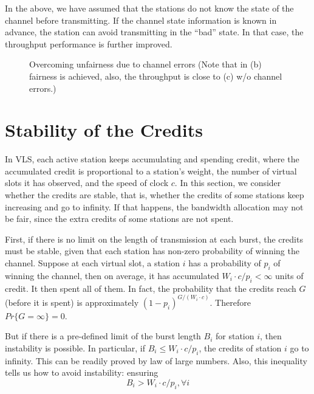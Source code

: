 \documentclass[letterpaper, 10 pt, conference]{ieeeconf}
\begin{document}
In the above, we have assumed that the stations do not know the state
of the channel before transmitting. If the channel state information
is known in advance, the station can avoid transmitting in the {}``bad''
state. In that case, the throughput performance is further improved.

\begin{figure}


\caption{\label{fig:channel error}Overcoming unfairness due to channel errors (Note that in (b) fairness is achieved, also, the throughput is close
to (c) w/o channel errors.)}

\end{figure}




\section{\label{sec:Stability}Stability of the Credits}

In VLS, each active station keeps accumulating and spending credit, where the accumulated credit is proportional to a station's weight, the number of virtual slots it has observed, and the speed of clock $c$. In this section, we consider whether the credits are stable, that is,
whether the credits of some stations keep increasing and go to infinity.
If that happens, the bandwidth allocation may not be fair, since the
extra credits of some stations are not spent.

First, if there is no limit on the length of transmission at each
burst, the credits must be stable, given that each station has non-zero
probability of winning the channel. Suppose at each virtual slot,
a station $i$ has a probability of $p_{i}$ of winning the channel,
then on average, it has accumulated $W_{i}\cdot c/p_{i}<\infty$ units
of credit. It then spent all of them. In fact, the probability that
the credits reach $G$ (before it is spent) is approximately $(1-p_{i})^{G/(W_{i}\cdot c)}$.
Therefore $Pr\{ G=\infty\}=0$.

But if there is a pre-defined limit of the burst length $B_{i}$ for
station $i$, then instability is possible. In particular, if $B_{i}\le W_{i}\cdot c/p_{i}$,
the credits of station $i$ go to infinity. This can be readily proved
by law of large numbers. Also, this inequality tells us how to avoid
instability: ensuring \begin{equation}
B_{i}>W_{i}\cdot c/p_{i},\forall i\label{eq:stability}\end{equation}
\end{document}
